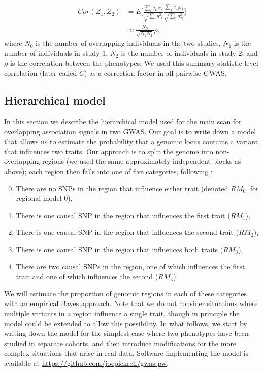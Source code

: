 \documentclass[11pt,titlepage]{article}
\begin{document}
\begin{align}
Cor(Z_1, Z_2) &= E \bigg[  \frac{\sum_ig_{1i} x_i}{ \sqrt{\sum_i g_{1i}^2}}\frac{ \sum_j g_{2j} y_j}{ \sqrt{\sum_j g_{2j}^2}} \bigg] \\
& \approx \frac{N_0}{\sqrt{N_1 N_2}} \rho,
\end{align}
\noindent where $N_0$ is the number of overlapping individuals in the two studies, $N_1$ is the number of individuals in study 1, $N_2$ is the number of individuals in study 2, and $\rho$ is the correlation between the phenotypes. We used this summary statistic-level correlation (later called $C$) as a correction factor in all pairwise GWAS. 

\subsection{Hierarchical model}  \label{hm}
In this section we describe the hierarchical model used for the main scan for overlapping association signals in two GWAS. Our goal is to write down a model that allows us to estimate the probability that a genomic locus contains a variant that influences two traits. Our approach is to split the genome into non-overlapping regions (we used the same approximately independent blocks as above); each region then falls into one of five categories, following \citet{Giambartolomei:2014aa}:
\begin{enumerate}
\setcounter{enumi}{-1}
\item There are no SNPs in the region that influence either trait (denoted $RM_{0}$, for regional model 0),
\item There is one causal SNP in the region that influences the first trait ($RM_1$),
\item There is one causal SNP in the region that influences the second trait ($RM_2$),
\item There is one causal SNP in the region that influences both traits ($RM_3$),
\item There are two causal SNPs in the region, one of which influences the first trait and one of which influences the second ($RM_4$).
\end{enumerate}

We will estimate the proportion of genomic regions in each of these categories with an empirical Bayes approach. Note that we do not consider situations where multiple variants in a region influence a single trait, though in principle the model could be extended to allow this possibility. In what follows, we start by writing down the model for the simplest case where two phenotypes have been studied in separate cohorts, and then introduce modifications for the more complex situations that arise in real data. Software implementing the model is available at \url{https://github.com/joepickrell/gwas-pw}. 
\end{document}
